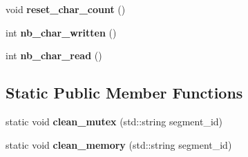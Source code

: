 \begin{DoxyCompactItemize}
void {\bfseries reset\+\_\+char\+\_\+count} ()
\item 
\mbox{\label{classshared__memory_1_1internal_1_1Exchange__manager__memory_ad30f6606b230c0fe4b4d3ec73da96a6c}} 
int {\bfseries nb\+\_\+char\+\_\+written} ()
\item 
\mbox{\label{classshared__memory_1_1internal_1_1Exchange__manager__memory_a76284109b7af9a05bf763154ba36391e}} 
int {\bfseries nb\+\_\+char\+\_\+read} ()
\end{DoxyCompactItemize}
\subsection*{Static Public Member Functions}
\begin{DoxyCompactItemize}
\item 
\mbox{\label{classshared__memory_1_1internal_1_1Exchange__manager__memory_a080eaca6885c4760620fd1df11907b66}} 
static void {\bfseries clean\+\_\+mutex} (std\+::string segment\+\_\+id)
\item 
\mbox{\label{classshared__memory_1_1internal_1_1Exchange__manager__memory_ab87f3b0b0511bebd1f084ca088044e5f}} 
static void {\bfseries clean\+\_\+memory} (std\+::string segment\+\_\+id)
\end{DoxyCompactItemize}
